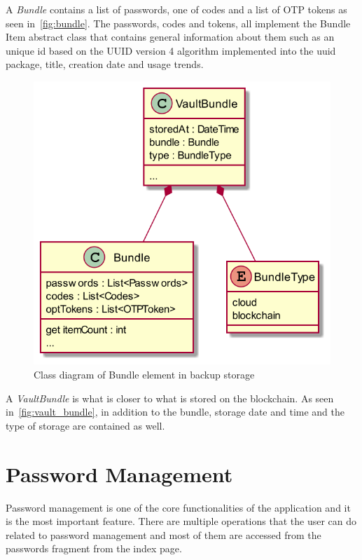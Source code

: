 \documentclass[a4paper,12pt]{report}
\begin{document}
A \textit{Bundle} contains a list of passwords, one of codes and a list of OTP
tokens as seen in~\autoref{fig:bundle}. The passwords, codes and tokens, all
implement the Bundle Item abstract class that contains general information
about them such as an unique id based on the UUID version 4
algorithm\cite{uuid} implemented into the uuid package\cite{uuidDocs}, title,
creation date and usage trends.

\begin{figure}[H]
    \centering
    \includegraphics[scale=0.4]{diagrams/class/vault.png}
    \caption{Class diagram of Bundle element in backup storage}\label{fig:vault_bundle}
\end{figure}

A \textit{VaultBundle} is what is closer to what is stored on the blockchain.
As seen in~\autoref{fig:vault_bundle}, in addition to the bundle, storage date
and time and the type of storage are contained as well.

\section{Password Management}

Password management is one of the core functionalities of the application and
it is the most important feature. There are multiple operations that the user
can do related to password management and most of them are accessed from the
passwords fragment from the index page.
\end{document}
